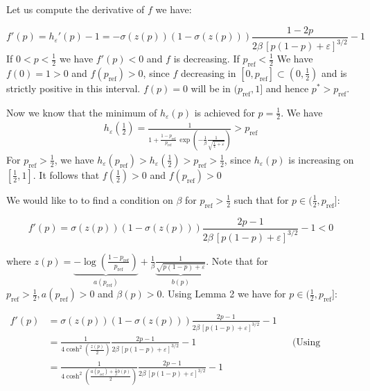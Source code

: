 \documentclass[11pt,reqno]{amsart}
\begin{document}
\iffalse
\noindent Let us compute the derivative of $f$ we have:

\[f'(p) = h_{\varepsilon}' (p) -1 = - \sigma(z(p)) (1-\sigma(z(p)))  \frac{1-2p}{2\beta\,[p(1-p)+\varepsilon]^{3/2}} -1 \]
If $0<p<\frac{1}{2}$ we have $f'(p) <0$ and $f$ is decreasing.
If $p_{\mathrm{ref}}<\frac{1}{2}$ We have $f(0)=1>0$ and $f(p_{\mathrm{ref}})>0$, since $f$ decreasing in $[0,p_{\mathrm{ref}}] \subset (0,\frac{1}{2})$ and is strictly positive in this interval.  $f(p)=0$ will be in $(p_{\mathrm{ref}},1]$ and hence $p^*>p_{\mathrm{ref}}$.


\noindent Now we know that the minimum of $h_{\varepsilon}(p)$ is achieved for $p=\frac{1}{2}$.
We have 
\begin{align*}
 h_{\varepsilon}\left(\frac{1}{2}\right) = \frac{1}{1+\frac{1-p_{\mathrm{ref}}}{p_{\mathrm{ref}}}\,\exp\!\left(-\frac{1}{\beta}\frac{1}{\sqrt{\frac{1}{4}+\varepsilon}}\right)} > p_{\mathrm{ref}}
\end{align*}
For $p_{\mathrm{ref}}>\frac{1}{2}$, we have $ h_{\varepsilon}(p_{\mathrm{ref}}) > h_{\varepsilon}\left(\frac{1}{2}\right) > p_{\mathrm{ref}}>\frac{1}{2}$, since $h_{\varepsilon}(p) $ is increasing on $[\frac{1}{2},1]$.  It follows that $f(\frac{1}{2})>0$ and $f(p_{\mathrm{ref}})>0$ 


We would like to to find a condition on $\beta$ for $p_{\mathrm{ref}}>\frac{1}{2}$ such that for $p \in ( \frac{1}{2},p_{\mathrm{ref}}]$: 

\[ f'(p) =  \sigma(z(p)) (1-\sigma(z(p)))  \frac{2p-1}{2\beta\,[p(1-p)+\varepsilon]^{3/2}} -1<0\]

 where $z(p) = \underbrace{- \log \left(  \frac{1-p_{\mathrm{ref}}}{p_{\mathrm{ref}}}   \right)}_{a(p_{\mathrm{ref}})}  +  \frac{1}{\beta}  \underbrace{\frac{1}{\sqrt{p(1-p) + \varepsilon}}}_{b(p)}$. Note that for $p_{\mathrm{ref}}>\frac{1}{2}, a(p_{\mathrm{ref}})>0$ and $\beta(p)>0$.  Using Lemma 2 we have for $p \in (\frac{1}{2},p_{\mathrm{ref}}]$:
  
 \begin{align*}
  f'(p)& =  \sigma(z(p)) (1-\sigma(z(p)))  \frac{2p-1}{2\beta\,[p(1-p)+\varepsilon]^{3/2}} -1 \\
  & = \frac{1}{4 \cosh^2(\frac{z(p)}{2})} \frac{2p-1}{2\beta\,[p(1-p)+\varepsilon]^{3/2}} -1 &&\text{(Using Lemma 2 (1))} \\
  & =  \frac{1}{4 \cosh^2\left(\frac{a(p_{\mathrm{ref}}) + \frac{1}{\beta} b(p)}{2} \right)} \frac{2p-1}{2\beta\,[p(1-p)+\varepsilon]^{3/2}} -1
 \end{align*}
 
\end{document}
